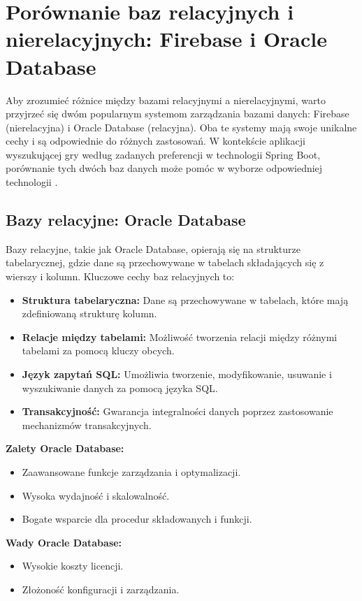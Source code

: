 \section{Porównanie baz relacyjnych i nierelacyjnych: Firebase i Oracle Database}

Aby zrozumieć różnice między bazami relacyjnymi a nierelacyjnymi, warto przyjrzeć się dwóm popularnym systemom zarządzania bazami danych: Firebase (nierelacyjna) i Oracle Database (relacyjna). Oba te systemy mają swoje unikalne cechy i są odpowiednie do różnych zastosowań. W kontekście aplikacji wyszukującej gry według zadanych preferencji w technologii Spring Boot, porównanie tych dwóch baz danych może pomóc w wyborze odpowiedniej technologii \cite{diffs}.

\subsection{Bazy relacyjne: Oracle Database}

Bazy relacyjne, takie jak Oracle Database, opierają się na strukturze tabelarycznej, gdzie dane są przechowywane w tabelach składających się z wierszy i kolumn. Kluczowe cechy baz relacyjnych to:

\begin{itemize}
\item \textbf{Struktura tabelaryczna:} Dane są przechowywane w tabelach, które mają zdefiniowaną strukturę kolumn.
\item \textbf{Relacje między tabelami:} Możliwość tworzenia relacji między różnymi tabelami za pomocą kluczy obcych.
\item \textbf{Język zapytań SQL:} Umożliwia tworzenie, modyfikowanie, usuwanie i wyszukiwanie danych za pomocą języka SQL.
\item \textbf{Transakcyjność:} Gwarancja integralności danych poprzez zastosowanie mechanizmów transakcyjnych.
\end{itemize}
\cite{oracleDb}

\textbf{Zalety Oracle Database:}
\begin{itemize}
\item Zaawansowane funkcje zarządzania i optymalizacji.
\item Wysoka wydajność i skalowalność.
\item Bogate wsparcie dla procedur składowanych i funkcji.
\end{itemize}

\textbf{Wady Oracle Database:}
\begin{itemize}
\item Wysokie koszty licencji.
\item Złożoność konfiguracji i zarządzania.
\end{itemize}

